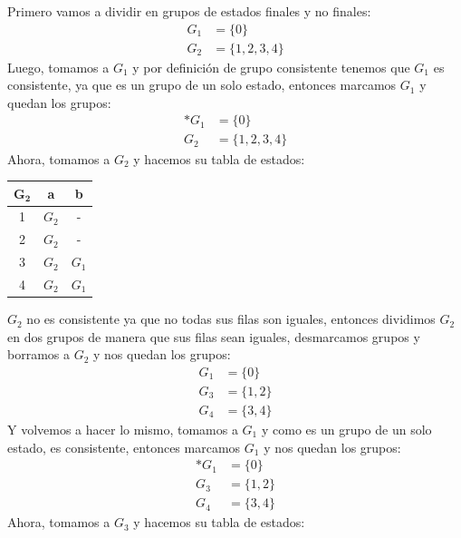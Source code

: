 \documentclass[12pt, letterpaper]{article}
\begin{document}
\begin{enumerate}
\begin{enumerate}
      Primero vamos a dividir en grupos de estados finales y no finales:
      \begin{align*}
        G_1 &= \{0\} \\
        G_2 &= \{1, 2, 3, 4\}
      \end{align*}
      Luego, tomamos a $G_1$ y por definición de grupo consistente tenemos que $G_1$ es consistente, ya que es un grupo de un solo estado, entonces marcamos $G_1$ y quedan los grupos:
      \begin{align*}
        \ast G_1 &= \{0\} \\
        G_2 &= \{1, 2, 3, 4\}
      \end{align*}
      Ahora, tomamos a $G_2$ y hacemos su tabla de estados:
      \begin{table}[H]
        \centering
        \begin{tabular}{|c|c|c|}
          \hline
          $\bm{G_2}$ & \textbf{a} & \textbf{b} \\ \hline
          1             & $G_2$       & -          \\ \hline
          2             & $G_2$       & -          \\ \hline
          3             & $G_2$       & $G_1$       \\ \hline
          4             & $G_2$       & $G_1$       \\ \hline
        \end{tabular}
      \end{table}
      $G_2$ no es consistente ya que no todas sus filas son iguales, entonces dividimos $G_2$ en dos grupos de manera que sus filas sean iguales, desmarcamos grupos y borramos a $G_2$ y nos quedan los grupos:
      \begin{align*}
        G_1 &= \{0\} \\
        G_3 &= \{1, 2\} \\
        G_4 &= \{3, 4\}
      \end{align*}
      Y volvemos a hacer lo mismo, tomamos a $G_1$ y como es un grupo de un solo estado, es consistente, entonces marcamos $G_1$ y nos quedan los grupos:
      \begin{align*}
        \ast G_1 &= \{0\} \\
        G_3 &= \{1, 2\} \\
        G_4 &= \{3, 4\}
      \end{align*}
      Ahora, tomamos a $G_3$ y hacemos su tabla de estados:
      \begin{table}[H]
        \centering

\end{table}
\end{enumerate}
\end{enumerate}
\end{document}
